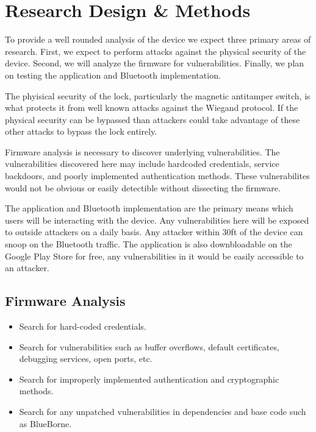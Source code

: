 \documentclass[10pt,twocolumn,letterpaper]{article}
\begin{document}

\section{Research Design \& Methods}
To provide a well rounded analysis of the device we expect three primary areas of research.  First, we expect to perform attacks against the physical security of the device.  Second, we will analyze the firmware for vulnerabilities.  Finally, we plan on testing the application and Bluetooth implementation.

The phyisical security of the lock, particularly the magnetic antitamper switch, is what protects it from well known attacks against the Wiegand protocol.  If the physical security can be bypassed than attackers could take advantage of these other attacks to bypass the lock entirely.

Firmware analysis is necessary to discover underlying vulnerabilities.  The vulnerabilities discovered here may include hardcoded credentials, service backdoors, and poorly implemented authentication methods.  These vulnerabilites would not be obvious or easily detectible without dissecting the firmware.

The application and Bluetooth implementation are the primary means which users will be interacting with the device.  Any vulnerabilities here will be exposed to outside attackers on a daily basis.  Any attacker within 30ft of the device can snoop on the Bluetooth traffic.  The application is also downbloadable on the Google Play Store for free, any vulnerabilities in it would be easily accessible to an attacker.

\subsection{Firmware Analysis}
\begin{itemize}
    \item Search for hard-coded credentials.
    \item Search for vulnerabilities such as buffer overflows, default certificates, debugging services, open ports, etc.
    \item Search for improperly implemented authentication and cryptographic methods.
    \item Search for any unpatched vulnerabilities in dependencies and base code such as BlueBorne.
\end{itemize}
\end{document}
